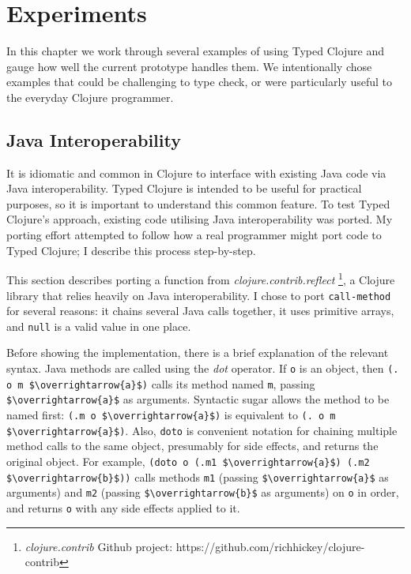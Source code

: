 \chapter{Experiments}

In this chapter we work through several examples of using Typed Clojure and
gauge how well the current prototype handles them. 
We intentionally chose examples that could be challenging to type check,
or were particularly useful to the everyday Clojure programmer.

\section{Java Interoperability}
\label{sec:experimentinterop}

It is idiomatic and common in Clojure to interface with existing Java code
via Java interoperability.
Typed Clojure is intended to be useful for practical purposes, so it is important
to understand this common feature.
To test Typed Clojure's approach, 
existing code utilising Java interoperability was ported.
My porting effort attempted to follow how a real programmer might port code to Typed Clojure;
I describe this process step-by-step.

This section describes porting a function from \emph{clojure.contrib.reflect}
\footnote{\emph{clojure.contrib} Github project: https://github.com/richhickey/clojure-contrib},
a Clojure library that relies heavily on Java interoperability.
I chose to port \lstinline|call-method| for several reasons: it chains several Java calls together,
it uses primitive arrays, and \lstinline|null| is a valid value in one place.

Before showing the implementation, there is a brief explanation of the relevant syntax.
Java methods are called using the \emph{dot} operator. If \lstinline|o| is an object,
then \lstinline[mathescape]|(. o m $\overrightarrow{a}$)|
calls its method named \lstinline|m|, passing \lstinline[mathescape]|$\overrightarrow{a}$| as arguments. 
Syntactic sugar allows the method to be named first:
\lstinline[mathescape]|(.m o $\overrightarrow{a}$)|
is equivalent to
\lstinline[mathescape]|(. o m $\overrightarrow{a}$)|.
Also, \lstinline|doto| is convenient 
notation for chaining multiple method calls to the same object, presumably for side effects, and returns the original
object. For example, \lstinline[mathescape]|(doto o (.m1 $\overrightarrow{a}$) (.m2 $\overrightarrow{b}$))| 
calls methods \lstinline|m1| (passing \lstinline[mathescape]|$\overrightarrow{a}$| as arguments)
and \lstinline|m2| (passing \lstinline[mathescape]|$\overrightarrow{b}$| as arguments)
on \lstinline|o| in order, and returns \lstinline|o| with any side effects applied to it.

